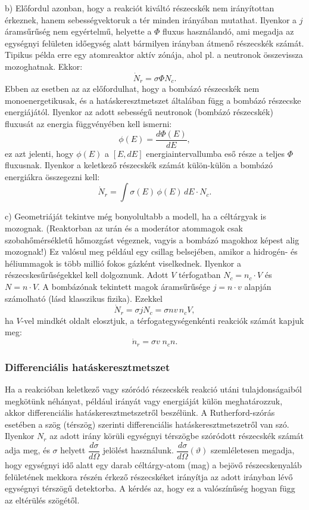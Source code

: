 \documentclass[a4paper,12pt]{article}
\begin{document}
b) Előfordul azonban, hogy a reakciót kiváltó részecskék nem irányítottan
érkeznek, hanem sebességvektoruk a tér minden irányában mutathat.
Ilyenkor a $j$ áram­sűrűség nem egyértelmű, helyette a $\Phi$ fluxus
használandó, ami megadja az egységnyi felületen időegység alatt
bármilyen irányban átmenő részecskék számát.
Tipikus példa erre egy atomreaktor aktív zónája, ahol pl. a neutronok
összevissza mozoghatnak.
Ekkor:
\[
\dot{N}_r=\sigma \Phi N_c.
\]
Ebben az esetben az az előfordulhat, hogy a bombázó részecskék nem
monoenergetikusak, és a hatáskeresztmetszet általában függ a bombázó
részecske energiájától.
Ilyenkor az adott sebességű neutronok (bombázó részecskék) fluxusát az
energia függvényében kell ismerni:
\[
\phi(E)=\frac{d\Phi(E)}{dE},
\]
ez azt jelenti, hogy $\phi(E)$ a $[E,dE]$ energiaintervallumba eső része
a teljes $\Phi$ fluxusnak.
Ilyenkor a keletkező részecskék számát külön-külön a bombázó energiákra
összegezni kell:
\[
\dot{N}_r=\int \sigma(E)\,\phi(E)\,dE\cdot N_c.
\]

c) Geometriáját tekintve még bonyolultabb a modell, ha a céltárgyak
is mozognak.
(Reaktorban az urán és a moderátor atommagok csak szobahőmérsékletű
hőmozgást végeznek, vagyis a bombázó magokhoz képest alig mozognak!)
Ez valósul meg például egy csillag belsejében, amikor a hidrogén- és
héliummagok is több millió fokos gázként viselkednek.
Ilyenkor a részecskesűrűségekkel kell dolgoznunk.
Adott $V$ térfogatban $N_c=n_c\cdot V$ és $N=n\cdot V$.
A bombázónak tekintett magok áramsűrűsége $j=n\cdot v$ alapján számolható
(lásd klasszikus fizika).
Ezekkel
\[
\dot{N}_r=\sigma j N_c=\sigma n v\, n_c V,
\]
ha $V$-vel mindkét oldalt elosztjuk, a térfogategységenkénti reakciók
számát kapjuk meg:
\[
\dot{n}_r=\sigma v\; n_c n.
\]

\subsubsection*{Differenciális hatáskeresztmetszet}

Ha a reakcióban keletkező vagy szóródó részecskék reakció utáni
tulajdonságaiból megkötünk néhányat, például irányát vagy energiáját
külön meghatározzuk, akkor differenciális hatáskeresztmetszetről
beszélünk.
A Rutherford-szórás esetében a szög (térszög) szerinti differenciális
hatáskeresztmetszetről van szó.
Ilyenkor $N_r$ az adott irány körüli egységnyi térszögbe szóródott
részecskék számát adja meg, és $\sigma$ helyett
$\dfrac{d\sigma}{d\Omega}$ jelölést használunk.
$\dfrac{d\sigma}{d\Omega}(\vartheta)$ szemléletesen megadja, hogy
egységnyi idő alatt egy darab céltárgy-atom (mag) a bejövő részecskenyaláb
felületének mekkora részén érkező részecskéket irányítja az adott
irányban lévő egységnyi térszögű detektorba.
A kérdés az, hogy ez a valószínűség hogyan függ az eltérülés szögétől.
\end{document}

